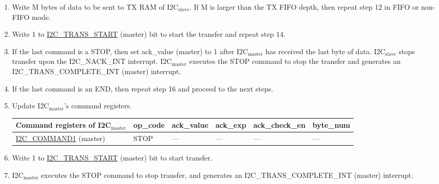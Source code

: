 \documentclass[main\_\_EN.tex]{subfiles}
\begin{document}
\begin{enumerate}
\item Write M bytes of data to be sent to TX RAM of I2C$_\text{slave}$. If M is larger than the TX FIFO depth, then repeat step 12 in FIFO or non-FIFO mode.
\item Write 1 to \hyperref[fielddesc:I2CTRANSSTART]{I2C\_TRANS\_START} (master) bit to start the transfer and repeat step 14.
\item If the last command is a STOP, then set ack\_value (master) to 1 after I2C$_\text{master}$ has received the last byte of data. I2C$_\text{slave}$ stops transfer upon the I2C\_NACK\_INT interrupt. I2C$_\text{master}$ executes the STOP command to stop the transfer and generates an I2C\_TRANS\_COMPLETE\_INT (master) interrupt.
\item If the last command is an END, then repeat step 16 and proceed to the next steps.
\item Update I2C$_\text{master}$'s command registers.
\begin{longtable}{ | p{4cm} | p{2cm} | p{2cm} | p{2cm} |p{2cm} | p{2cm} |}
\hline\rowcolor{lightgray}
Command registers of I2C$_\text{master}$& op\_code & ack\_value&ack\_exp&ack\_check\_en&byte\_num  \\ \hline
\hyperref[fielddesc:I2CCOMMAND1]{I2C\_COMMAND1} (master)& STOP& ---&---&---&---  \\ \hline
\end{longtable}
\item Write 1 to \hyperref[fielddesc:I2CTRANSSTART]{I2C\_TRANS\_START} (master) bit to start transfer.
\item I2C$_\text{master}$ executes the STOP command to stop transfer, and generates an I2C\_TRANS\_COMPLETE\_INT (master) interrupt.

\end{enumerate}
\end{document}
